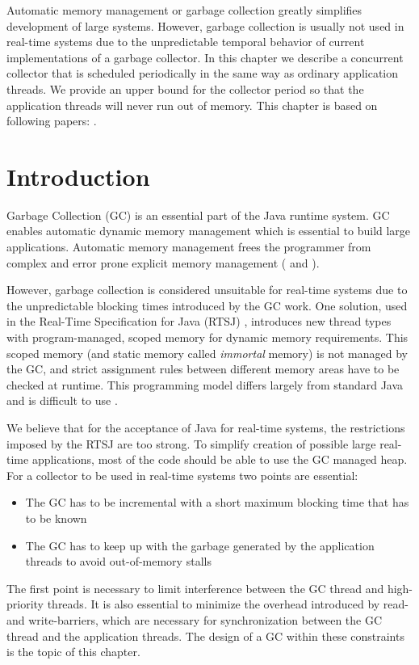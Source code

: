Automatic memory management or garbage collection greatly simplifies
development of large systems. However, garbage collection is usually
not used in real-time systems due to the unpredictable temporal
behavior of current implementations of a garbage collector. In this
chapter we describe a concurrent collector that is scheduled
periodically in the same way as ordinary application threads. We
provide an upper bound for the collector period so that the
application threads will never run out of memory. This chapter is
based on following papers:
\cite{jop:rtgc_sched,jop:scjgc,jop:nbobjcopy:jtres2008}.


\section{Introduction}

Garbage Collection (GC) is an essential part of the Java runtime
system. GC enables automatic dynamic memory management which is
essential to build large applications. Automatic memory management
frees the programmer from complex and error prone explicit memory
management ( and ).

However, garbage collection is considered unsuitable for real-time
systems due to the unpredictable blocking times introduced by the GC
work. One solution, used in the Real-Time Specification for Java
(RTSJ) \cite{rtsj}, introduces new thread types with program-managed,
scoped memory for dynamic memory requirements. This scoped memory
(and static memory called \emph{immortal} memory) is not managed by
the GC, and strict assignment rules between different memory areas
have to be checked at runtime. This programming model differs largely
from standard Java and is difficult to use \cite{Niessner03,
conf/isorc/PizloFHV04}.

We believe that for the acceptance of Java for real-time systems, the
restrictions imposed by the RTSJ are too strong. To simplify creation
of possible large real-time applications, most of the code should be
able to use the GC managed heap. For a collector to be used in
real-time systems two points are essential:
\begin{itemize}
    \item The GC has to be incremental with a short maximum blocking time
    that has to be known
    \item The GC has to keep up with the garbage generated by the
    application threads to avoid out-of-memory stalls
\end{itemize}
The first point is necessary to limit interference between the GC
thread and high-priority threads. It is also essential to minimize
the overhead introduced by read- and write-barriers, which are
necessary for synchronization between the GC thread and the
application threads. The design of a GC within these constraints is
the topic of this chapter.

